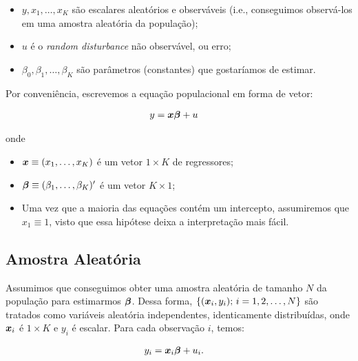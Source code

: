 \documentclass[11pt,oneside,a4paper]{article}
\numberwithin{equation}{section}
\begin{document}
\begin{itemize} \itemsep0pt
\item $y, x_{1}, \dots, x_{K}$  são escalares aleatórios e observáveis (i.e., conseguimos observá-los em uma amostra aleatória da população);

\item $u$ é o \textit{random disturbance} não observável, ou erro; 

\item $\beta_{0}, \beta_{1}, \dots, \beta_{K}$ são parâmetros (constantes) que gostaríamos de estimar.
\end{itemize}

Por conveniência, escrevemos a equação populacional em forma de vetor:

\vspace{-1 em}
\begin{align*}
	y &= \boldsymbol{x} \boldsymbol{\beta} + u
\end{align*}
\vspace{-1 em}

\noindent
onde

\begin{itemize} \itemsep0pt
\item $\boldsymbol{x} \equiv (x_{1}, \dots, x_{K})$ é um vetor $1 \times K$ de regressores;

\item $\boldsymbol{\beta} \equiv (\beta_{1}, \dots, \beta_{K})'$ é um vetor $K \times 1$;

\item Uma vez que a maioria das equações contém um intercepto, assumiremos que $x_{1} \equiv 1$, visto que essa hipótese deixa a interpretação mais fácil.
\end{itemize}

\subsection*{Amostra Aleatória} 

Assumimos que conseguimos obter uma amostra aleatória de tamanho $N$ da população para estimarmos $\boldsymbol{\beta}$.
Dessa forma, $\{ (\boldsymbol{x}_{i}, y_{i}); \, i = 1, 2, \dots, N \}$
são tratados como variáveis aleatória independentes, identicamente distribuídas, onde
$\boldsymbol{x}_{i}$ é $1 \times K$ e $y_{i}$ é escalar.
Para cada observação $i$, temos:

\vspace{-1 em}
\begin{align*}
	y_{i} &= \boldsymbol{x}_{i} \boldsymbol{\beta} + u_{i}.
\end{align*}
\end{document}
